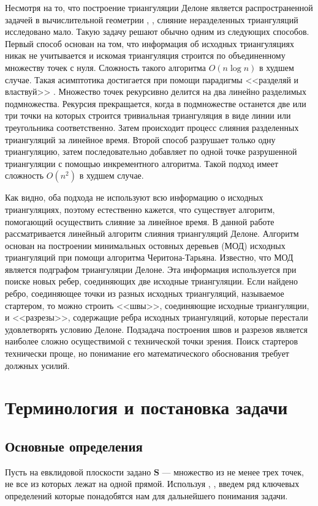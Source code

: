 \documentclass[12pt]{article}
\begin{document}
Несмотря на то, что построение триангуляции Делоне является распространенной задачей
в вычислительной геометрии \cite{Skvortsov}, \cite{Dyshkant},
слияние неразделенных триангуляций исследовано мало.
Такую задачу решают обычно одним из следующих способов.
Первый способ основан на том, что информация об исходных триангуляциях никак не учитывается и искомая триангуляция строится
по объединенному множеству точек с нуля. Сложность такого алгоритма $O(n\log n)$ в худшем случае.
Такая асимптотика достигается при помощи парадигмы <<разделяй и властвуй>> \cite[стр. 44-45]{Skvortsov}.
Множество точек рекурсивно делится на два линейно разделимых подмножества.
Рекурсия прекращается, когда в подмножестве останется две или три точки
на которых строится тривиальная триангуляция в виде линии или треугольника соответственно.
Затем происходит процесс слияния разделенных триангуляций за линейное время.
Второй способ разрушает только одну триангуляцию,
затем последовательно добавляет по одной точке разрушенной триангуляции с помощью инкрементного алгоритма.
Такой подход имеет сложность $O(n^2)$ в худшем случае.

Как видно, оба подхода не используют всю информацию о исходных триангуляциях,
поэтому естественно кажется, что существует алгоритм, помогающий осуществить слияние за линейное время.
В данной работе рассматривается линейный алгоритм слияния триангуляций Делоне.
Алгоритм основан на построении минимальных остовных деревьев (МОД) исходных триангуляций
при помощи алгоритма Черитона-Тарьяна.
Известно, что МОД является подграфом триангуляции Делоне.
Эта информация используется при поиске новых ребер, соединяющих две исходные триангуляции.
Если найдено ребро, соединяющее точки из разных исходных триангуляций, называемое стартером,
то можно строить <<швы>>, соединяющие исходные триангуляции,
и <<разрезы>>, содержащие ребра исходных триангуляций, которые перестали удовлетворять условию Делоне.
Подзадача построения швов и разрезов является наиболее сложно осуществимой с технической точки зрения.
Поиск стартеров технически проще, но понимание его математического обоснования
требует должных усилий.

\section{Терминология и постановка задачи}

\subsection{Основные определения}
Пусть на евклидовой плоскости задано $\textbf{S}$ --- множество из не менее трех точек, не все из которых лежат на одной прямой.
Используя \cite[стр.~7-8]{Skvortsov}, \cite{MestOverlap}, введем ряд ключевых определений которые понадобятся нам для дальнейшего понимания задачи.
\end{document}
